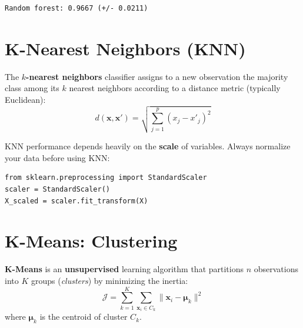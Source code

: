 \begin{codeoutput}
\begin{verbatim}
Random forest: 0.9667 (+/- 0.0211)
\end{verbatim}
\end{codeoutput}

\section{K-Nearest Neighbors (KNN)}
\label{sec:knn_detail}


\begin{definition}[KNN]
The \textbf{$k$-nearest neighbors} classifier assigns to a new observation the majority class among its $k$ nearest neighbors according to a distance metric (typically Euclidean):
\[
d(\mathbf{x}, \mathbf{x}') = \sqrt{\sum_{j=1}^{p}(x_j - x'_j)^2}
\]
\end{definition}

\begin{bestpractice}
KNN performance depends heavily on the \textbf{scale} of variables. Always normalize your data before using KNN:
\begin{verbatim}
from sklearn.preprocessing import StandardScaler
scaler = StandardScaler()
X_scaled = scaler.fit_transform(X)
\end{verbatim}
\end{bestpractice}

\section{K-Means: Clustering}
\label{sec:kmeans}


\begin{definition}[K-Means]
\textbf{K-Means} is an \textbf{unsupervised} learning algorithm that partitions $n$ observations into $K$ groups (\textit{clusters}) by minimizing the inertia:
\[
\mathcal{J} = \sum_{k=1}^{K}\sum_{\mathbf{x}_i \in C_k} \| \mathbf{x}_i - \boldsymbol{\mu}_k \|^2
\]
where $\boldsymbol{\mu}_k$ is the centroid of cluster $C_k$.
\end{definition}

